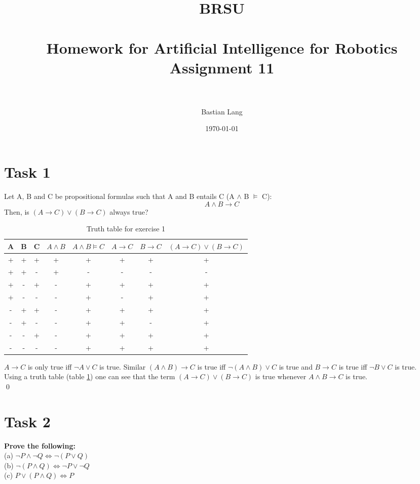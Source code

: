 \documentclass[paper=a4, fontsize=11pt]{scrartcl} %
\title{	
\normalfont \normalsize 
\textsc{BRSU} \\ [25pt] %
\horrule{0.5pt} \\[0.4cm] %
\huge Homework for Artificial Intelligence for Robotics\\Assignment 11 \\ %
\horrule{2pt} \\[0.5cm] %
}
\author{Bastian Lang} %
\date{\normalsize\today} %
\numberwithin{equation}{section} %
\numberwithin{figure}{section} %
\numberwithin{table}{section} %
\begin{document}
\maketitle %


\section{Task 1}
Let A, B and C be propositional formulas such that A and B entails C (A $\land$ B $\vDash$ C):
\[A\land B\to C\]
Then, is $(A\to C) \lor (B \to C)$ always true?\\
\begin{table}[h]
\begin{tabular}{|c|c|c|c|c|c|c|c|}
\hline
A&B&C&$A\land B$&$A\land B\vDash C$ & $A\to C$& $B\to C$&$(A\to C)\lor (B\to C)$\\
\hline
+&+&+&+&+&+&+&+\\
+&+&-&+&-&-&-&-\\
+&-&+&-&+&+&+&+\\
+&-&-&-&+&-&+&+\\
\hline
-&+&+&-&+&+&+&+\\
-&+&-&-&+&+&-&+\\
-&-&+&-&+&+&+&+\\
-&-&-&-&+&+&+&+\\
\hline
\end{tabular}
\caption{Truth table for exercise 1}
\label{tab:ex1}
\end{table}

$A\to C$ is only true iff $\neg A \lor C$ is true. Similar $(A\land B)\to C$ is true iff $\neg (A\land B)\lor C$ is true and $B\to C$ is true iff $\neg B\lor C$ is true.\\
Using a truth table (table \ref{tab:ex1}) one can see that the term $(A\to C) \lor (B \to C)$ is true whenever $A\land B\to C$ is true.\\\qed

\section{Task 2}
\textbf{Prove the following:}\vspace{5mm}\\
(a) \hspace{10mm}$\neg P\land\neg Q\Leftrightarrow\neg(P\lor Q)$\\
(b) \hspace{10mm}$\neg (P\land Q) \Leftrightarrow\neg P\lor\neg Q$\\
(c) \hspace{10mm}$P\lor (P\land Q)\Leftrightarrow P$\\
\end{document}
